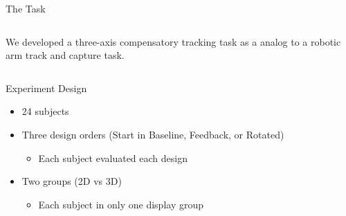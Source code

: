 \documentclass[10pt]{beamer}
\begin{document}
\begin{frame}[fragile]{The Task}
  \begin{columns}[T]
    \begin{column}{.8\textwidth}
      We developed a three-axis compensatory tracking task as a analog to a robotic arm track and capture task.
    \end{column}
  \end{columns}
\end{frame}

\begin{frame}[fragile]{Experiment Design}
  \begin{itemize}
    \setlength\itemsep{1em}
    \item 24 subjects
    \item Three design orders (Start in Baseline, Feedback, or Rotated)
    \begin{itemize}
      \item Each subject evaluated each design
    \end{itemize}
    \item Two groups (2D vs 3D)
    \begin{itemize}
      \item Each subject in only one display group
    \end{itemize}
  \end{itemize}
\end{frame}
\end{document}
